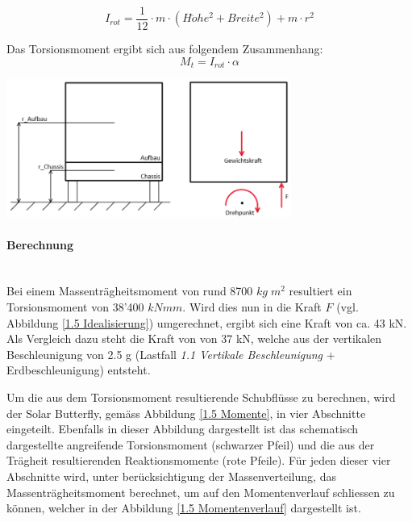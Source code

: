 \begin{equation}
  I_{rot} = \frac{1}{12} \cdot m \cdot \left(H\ddot{o}he^2 + Breite^2\right) + m \cdot r^2
\end{equation}

Das Torsionsmoment ergibt sich aus folgendem Zusammenhang:
\begin{equation}
  M_t = I_{rot} \cdot \alpha
\end{equation}

\begin{center}
  \includegraphics[width=0.7\textwidth]{04_Figures/1.5 Idealisierung.png}
  \label{1.5 Idealisierung}
\end{center}

\paragraph{Berechnung}\mbox{}\\
Bei einem Massenträgheitsmoment von rund 8700 $kg\;m^2$ resultiert ein Torsionsmoment von 38'400 $kNmm$. Wird dies nun in die Kraft $F$ (vgl. Abbildung \ref{1.5 Idealisierung}) umgerechnet, ergibt sich eine Kraft von ca. 43 kN. Als Vergleich dazu steht die Kraft von von 37 kN, welche aus der vertikalen Beschleunigung von 2.5 g (Lastfall \emph{1.1 Vertikale Beschleunigung} + Erdbeschleunigung) entsteht.

Um die aus dem Torsionsmoment resultierende Schubflüsse zu berechnen, wird der Solar Butterfly, gemäss Abbildung \ref{1.5 Momente}, in vier Abschnitte eingeteilt. Ebenfalls in dieser Abbildung dargestellt ist das schematisch dargestellte angreifende Torsionsmoment (schwarzer Pfeil) und die aus der Trägheit resultierenden Reaktionsmomente (rote Pfeile). Für jeden dieser vier Abschnitte wird, unter berücksichtigung der Massenverteilung, das Massenträgheitsmoment berechnet, um auf den Momentenverlauf schliessen zu können, welcher in der Abbildung \ref{1.5 Momentenverlauf} dargestellt ist.

